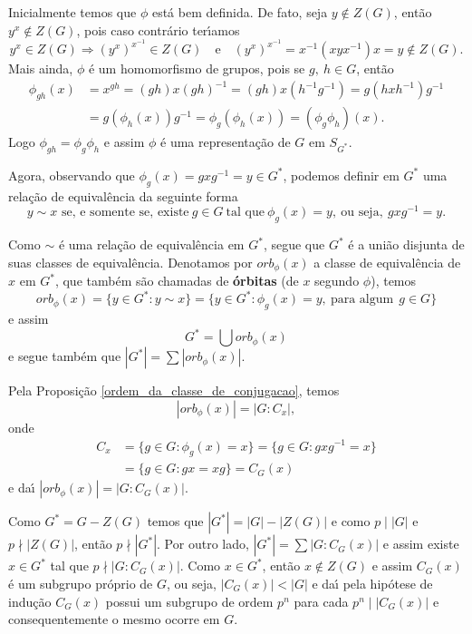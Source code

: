 \begin{prova}
Inicialmente temos que $\phi$ est{\'a} bem definida. De fato, seja $y \notin Z(G)$, ent{\~a}o $y^x \notin Z(G)$, pois caso contr{\'a}rio
ter{\'\i}amos
\[
y^x \in Z(G) \Rightarrow (y^x)^{x^{-1}} \in Z(G) \quad
\text{e}\quad (y^x)^{x^{-1}} = x^{-1}(xyx^{-1})x = y \notin Z(G).
\]
Mais ainda, $\phi$ {\'e} um homomorfismo de grupos, pois se $g,\ h \in G$, ent{\~a}o
\begin{align*}
\phi_{gh} (x) &= x^{gh} =
(gh)x(gh)^{-1} = (gh)x(h^{-1}g^{-1}) = g(hxh^{-1})g^{-1} \\&=
g(\phi_h (x))g^{-1} = \phi_g (\phi_h (x)) = (\phi_g \phi_h)(x).
\end{align*}
Logo $\phi_{gh} = \phi_g \phi_h$ e assim $\phi$ {\'e} uma representa{\c c}{\~a}o de $G$ em $S_{G^*}$.

Agora, observando que $\phi_g(x) = gxg^{-1} = y \in G^*$, podemos definir em $G^*$ uma rela{\c c}{\~a}o de equival{\^e}ncia da seguinte forma
\[
y \sim x \mbox{ se, e somente se, existe}\ g \in G\ \mbox{tal que}\ \phi_g (x) = y,\
\text{ou seja},\ gxg^{-1} = y.
\]

Como $\sim$ {\'e} uma rela{\c c}{\~a}o de equival{\^e}ncia em $G^*$, segue que $G^*$ {\'e} a uni{\~a}o disjunta de suas classes de equival{\^e}ncia. Denotamos por $orb_\phi (x)$ a classe de equival{\^e}ncia de $x$ em $G^*$, que tamb{\'e}m s{\~a}o chamadas de \textbf{{\'o}rbitas} (de $x$ segundo $\phi$), temos
\[
orb_\phi (x) = \{y \in G^* : y \sim x \} = \{y
\in G^* : \phi_g (x) = y,\ \mbox{para algum}\ \ g \in G \}
\]
e assim 
\[
G^* = \bigcup orb_\phi (x)
\] e segue tamb{\'e}m que $|G^*| = \sum |orb_\phi
(x)|$.

Pela Proposi\c{c}\~ao \ref{ordem_da_classe_de_conjugacao}, temos
\[
|orb_\phi (x)| = |G : C_x|,
\]
onde
\begin{align*}
C_x &= \{g \in G : \phi_g (x) = x \} = \{g \in G
: gxg^{-1} = x \} \\
&= \{g \in G : gx = xg \} = C_G (x)
\end{align*}
e da{\'\i} $|orb_\phi (x)| = |G : C_G (x)|$.

Como $G^* = G - Z(G)$ temos que $|G^*| = |G| - |Z(G)|$ e como $p \mid |G|$ e $p \nmid |Z(G)|$, ent{\~a}o $p \nmid |G^*|$. Por outro lado, $|G^*| = \sum
|G : C_G(x)|$ e assim existe $x \in G^*$ tal que $p \nmid |G : C_G(x)|$. Como $x \in G^*$, ent{\~a}o $x \notin Z(G)$ e assim $C_G(x)$ {\'e}
um subgrupo pr{\'o}prio de $G$, ou seja, $|C_G(x)| < |G|$ e da{\'\i} pela hip{\'o}tese de indu{\c c}{\~a}o $C_G(x)$ possui um subgrupo de ordem $p^n$
para cada $p^n \mid |C_G(x)|$ e consequentemente o mesmo ocorre em $G$.
\end{prova}

